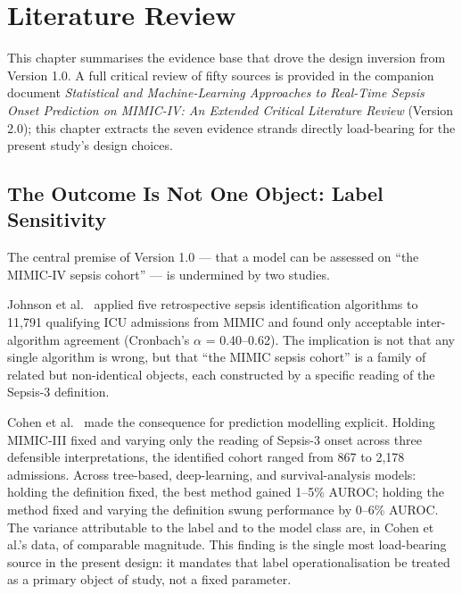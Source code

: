 \chapter{Literature Review}
\label{ch:review}

This chapter summarises the evidence base that drove the design inversion from
Version 1.0. A full critical review of fifty sources is provided in the companion
document \textit{Statistical and Machine-Learning Approaches to Real-Time Sepsis
Onset Prediction on MIMIC-IV: An Extended Critical Literature Review} (Version 2.0);
this chapter extracts the seven evidence strands directly load-bearing for the
present study's design choices.

\section{The Outcome Is Not One Object: Label Sensitivity}

The central premise of Version 1.0 --- that a model can be assessed on
``the MIMIC-IV sepsis cohort'' --- is undermined by two studies.

Johnson et al.\ \parencite{johnson2018comparative} applied five retrospective
sepsis identification algorithms to 11{,}791 qualifying ICU admissions from
MIMIC and found only acceptable inter-algorithm agreement (Cronbach's $\alpha$
= 0.40--0.62). The implication is not that any single algorithm is wrong, but
that ``the MIMIC sepsis cohort'' is a family of related but non-identical objects,
each constructed by a specific reading of the Sepsis-3 definition.

Cohen et al.\ \parencite{cohen2024subtle} made the consequence for prediction
modelling explicit. Holding MIMIC-III fixed and varying only the reading of
Sepsis-3 onset across three defensible interpretations, the identified cohort
ranged from 867 to 2{,}178 admissions. Across tree-based, deep-learning, and
survival-analysis models: holding the definition fixed, the best method gained
1--5\% AUROC; holding the method fixed and varying the definition swung
performance by 0--6\% AUROC. The variance attributable to the label and to the
model class are, in Cohen et al.'s data, of comparable magnitude. This finding
is the single most load-bearing source in the present design: it mandates that
label operationalisation be treated as a primary object of study, not a fixed
parameter.

